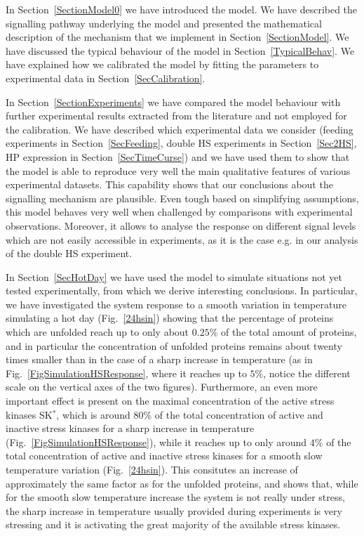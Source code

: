 \documentclass[oneside, 10pt, a4paper, twocolumn]{article}
\begin{document}
In Section~\ref{SectionModel0} we have introduced the model. We have described the signalling pathway underlying the model and presented the mathematical description of the mechanism that we implement in Section~\ref{SectionModel}. We have discussed the typical behaviour of the model in Section~\ref{TypicalBehav}. We have explained how we calibrated the model by fitting the parameters to experimental data in Section~\ref{SecCalibration}.

In Section~\ref{SectionExperiments} we have compared the model behaviour with further experimental results extracted from the literature and not employed for the calibration. We have described which experimental data we consider (feeding experiments in Section~\ref{SecFeeding}, double HS experiments in Section~\ref{Sec2HS}, HP expression in Section~\ref{SecTimeCurse}) and we have used them to show that the model is able to reproduce very well the main qualitative features of various experimental datasets. This capability shows that our conclusions about the signalling mechanism are plausible. Even tough based on simplifying assumptions, this model behaves very well when challenged by comparisons with experimental observations. Moreover, it allows to analyse the response on different signal levels which are not easily accessible in experiments, as it is the case e.g. in our analysis of the double HS experiment. 

In Section~\ref{SecHotDay} we have used the model to simulate situations not yet tested experimentally, from which we derive interesting conclusions. 
In particular, we have investigated the system response to a smooth variation in temperature simulating a hot day (Fig.~\ref{24hsin}) showing that the percentage of proteins which are unfolded reach up to only about $0.25 \%$ of the total amount of proteins, and in particular the concentration of unfolded proteins remains about twenty times smaller than in the case of a sharp increase in temperature (as in Fig.~\ref{FigSimulationHSResponse}, where it reaches up to  $5\%$, notice the different scale on the vertical axes of the two figures). Furthermore, an even more important effect is present on the maximal concentration of the active stress kinases SK$^*$, which is around $80\%$ of the total concentration of active and inactive stress kinases for a sharp increase in temperature (Fig.~\ref{FigSimulationHSResponse}), while it reaches up to only around $4\%$ of the total concentration of active and inactive stress kinases for a smooth slow temperature variation (Fig.~\ref{24hsin}). This consitutes an increase of approximately the same factor as for the unfolded proteins, and shows that, while for the smooth slow temperature increase the system is not really under stress, the sharp increase in temperature usually provided during experiments is very stressing and it is activating the great majority of the available stress kinases.
\end{document}
